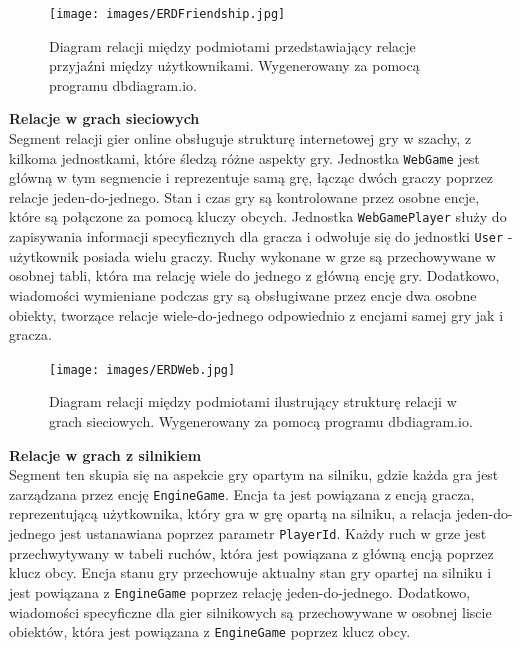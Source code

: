 \documentclass[twoside]{projektInzynierskiMS1}
\begin{document}
\vspace{0.5cm}
\begin{figure}[h!]
    \centering
    \texttt{[image: images/ERDFriendship.jpg]}
    \caption{Diagram relacji między podmiotami przedstawiający relacje przyjaźni między użytkownikami. Wygenerowany za pomocą programu dbdiagram.io.}
\end{figure}

\newpage

\noindent \textbf{Relacje w grach sieciowych}\\
Segment relacji gier online obsługuje strukturę internetowej gry w szachy, z kilkoma jednostkami, które śledzą różne aspekty gry. Jednostka \texttt{WebGame} jest główną w tym segmencie i reprezentuje samą grę, łącząc dwóch graczy poprzez relacje jeden-do-jednego. Stan i czas gry są kontrolowane przez osobne encje, które są połączone za pomocą kluczy obcych. Jednostka \texttt{WebGamePlayer} służy do zapisywania informacji specyficznych dla gracza i odwołuje się do jednostki \texttt{User} - użytkownik posiada wielu graczy. Ruchy wykonane w grze są przechowywane w osobnej tabli, która ma relację wiele do jednego z główną encję gry. Dodatkowo, wiadomości wymieniane podczas gry są obsługiwane przez encje dwa osobne obiekty, tworzące relacje wiele-do-jednego odpowiednio z encjami samej gry jak i gracza.

\vspace{0.5cm}
\begin{figure}[h!]
    \centering
    \texttt{[image: images/ERDWeb.jpg]}
    \caption{Diagram relacji między podmiotami ilustrujący strukturę relacji w grach sieciowych. Wygenerowany za pomocą programu dbdiagram.io.}
\end{figure}

\newpage

\noindent \textbf{Relacje w grach z silnikiem}\\
Segment ten skupia się na aspekcie gry opartym na silniku, gdzie każda gra jest zarządzana przez encję \texttt{EngineGame}. Encja ta jest powiązana z encją gracza, reprezentującą użytkownika, który gra w grę opartą na silniku, a relacja jeden-do-jednego jest ustanawiana poprzez parametr \texttt{PlayerId}. Każdy ruch w grze jest przechwytywany w tabeli ruchów, która jest powiązana z główną encją poprzez klucz obcy. Encja stanu gry przechowuje aktualny stan gry opartej na silniku i jest powiązana z \texttt{EngineGame} poprzez relację jeden-do-jednego. Dodatkowo, wiadomości specyficzne dla gier silnikowych są przechowywane w osobnej liscie obiektów, która jest powiązana z \texttt{EngineGame} poprzez klucz obcy.
\end{document}
